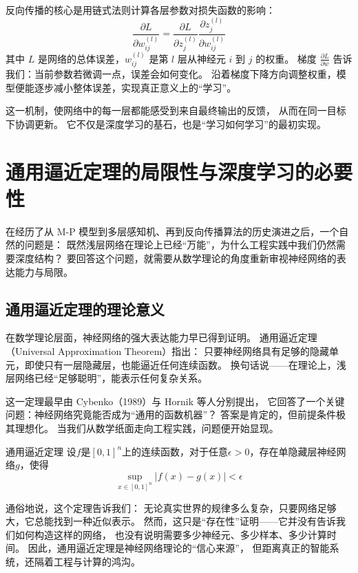 反向传播的核心是用链式法则计算各层参数对损失函数的影响：  
\begin{equation}
\frac{\partial L}{\partial w_{ij}^{(l)}} = \frac{\partial L}{\partial z_j^{(l)}} \frac{\partial z_j^{(l)}}{\partial w_{ij}^{(l)}}
\end{equation}
其中 $L$ 是网络的总体误差，$w_{ij}^{(l)}$ 是第 $l$ 层从神经元 $i$ 到 $j$ 的权重。  
梯度 $\frac{\partial L}{\partial w}$ 告诉我们：当前参数若微调一点，误差会如何变化。  
沿着梯度下降方向调整权重，模型便能逐步减小整体误差，实现真正意义上的“学习”。  

这一机制，使网络中的每一层都能感受到来自最终输出的反馈，  
从而在同一目标下协调更新。  
它不仅是深度学习的基石，也是“学习如何学习”的最初实现。

\section{通用逼近定理的局限性与深度学习的必要性}
在经历了从 M-P 模型到多层感知机、再到反向传播算法的历史演进之后，一个自然的问题是：  
既然浅层网络在理论上已经“万能”，为什么工程实践中我们仍然需要深度结构？  
要回答这个问题，就需要从数学理论的角度重新审视神经网络的表达能力与局限。

\subsection{通用逼近定理的理论意义}
在数学理论层面，神经网络的强大表达能力早已得到证明。  
通用逼近定理（Universal Approximation Theorem）指出：  
只要神经网络具有足够的隐藏单元，即使只有一层隐藏层，也能逼近任何连续函数。  
换句话说——在理论上，浅层网络已经“足够聪明”，能表示任何复杂关系。  

这一定理最早由 Cybenko（1989）与 Hornik 等人分别提出，  
它回答了一个关键问题：神经网络究竟能否成为“通用的函数机器”？  
答案是肯定的，但前提条件极其理想化。  
当我们从数学纸面走向工程实践，问题便开始显现。

\begin{theorem}[]{通用逼近定理}
设$f$是$[0,1]^n$上的连续函数，对于任意$\epsilon > 0$，存在单隐藏层神经网络$g$，使得
$$\sup_{x \in [0,1]^n} |f(x) - g(x)| < \epsilon$$
\end{theorem}

通俗地说，这个定理告诉我们：  
无论真实世界的规律多么复杂，只要网络足够大，它总能找到一种近似表示。  
然而，这只是“存在性”证明——它并没有告诉我们如何构造这样的网络，  
也没有说明需要多少神经元、多少样本、多少计算时间。  
因此，通用逼近定理是神经网络理论的“信心来源”，  
但距离真正的智能系统，还隔着工程与计算的鸿沟。


